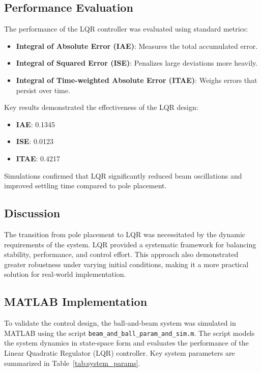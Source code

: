 \documentclass[conference]{IEEEtran}
\begin{document}
\subsection{Performance Evaluation}
\label{control_performance}
The performance of the LQR controller was evaluated using standard metrics:
\begin{itemize}
    \item \textbf{Integral of Absolute Error (IAE)}: Measures the total accumulated error.
    \item \textbf{Integral of Squared Error (ISE)}: Penalizes large deviations more heavily.
    \item \textbf{Integral of Time-weighted Absolute Error (ITAE)}: Weighs errors that persist over time.
\end{itemize}

Key results demonstrated the effectiveness of the LQR design:
\begin{itemize}
    \item \textbf{IAE}: 0.1345
    \item \textbf{ISE}: 0.0123
    \item \textbf{ITAE}: 0.4217
\end{itemize}
Simulations confirmed that LQR significantly reduced beam oscillations and improved settling time compared to pole placement.

\subsection{Discussion}
\label{control_discuss}
The transition from pole placement to LQR was necessitated by the dynamic requirements of the system. LQR provided a systematic framework for balancing stability, performance, and control effort. This approach also demonstrated greater robustness under varying initial conditions, making it a more practical solution for real-world implementation.

\subsection{MATLAB Implementation}
\label{subsec:matlab_implementation}

To validate the control design, the ball-and-beam system was simulated in MATLAB using the script \texttt{beam\_and\_ball\_param\_and\_sim.m}. The script models the system dynamics in state-space form and evaluates the performance of the Linear Quadratic Regulator (LQR) controller. Key system parameters are summarized in Table~\ref{tab:system_params}.
\end{document}
